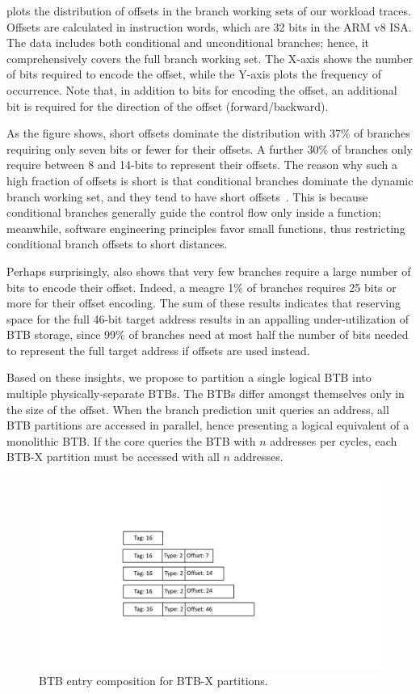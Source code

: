  plots the distribution of offsets in the branch working sets of our workload traces. Offsets are calculated in instruction words, which are 32 bits in the ARM v8 ISA. The data includes both conditional and unconditional branches; hence, it comprehensively covers the full branch working set. The X-axis shows the number of bits required to encode the offset, while the Y-axis plots the frequency of occurrence. Note that, in addition to bits for encoding the offset, an additional bit is required for the direction of the offset (forward/backward). 

As the figure shows, short offsets dominate the distribution with 37\% of branches requiring only seven bits or fewer for their offsets. A further 30\% of branches only require between 8 and 14-bits to represent their offsets. The reason why such a high fraction of offsets is short is that conditional branches dominate the dynamic branch working set, and they tend to have short offsets~\cite{boomerang}. This is because conditional branches generally guide the control flow only inside a function; meanwhile, software engineering principles favor small functions, thus restricting conditional branch offsets to short distances.

Perhaps surprisingly,  also shows that very few branches require a large number of bits to encode their offset. Indeed, a meagre 1\% of branches requires 25 bits or more for their offset encoding. The sum of these results indicates that reserving space for the full 46-bit target address results in an appalling under-utilization of BTB storage, since 99\% of branches need at most half the number of bits needed to represent the full target address if offsets are used instead.  

Based on these insights, we propose to partition a single logical BTB into multiple physically-separate BTBs. The BTBs differ amongst themselves only in the size of the offset. When the branch prediction unit queries an address, all BTB partitions are accessed in parallel, hence presenting a logical equivalent of a monolithic BTB. If the core queries the BTB with $n$ addresses per cycles, each BTB-X partition must be accessed with all $n$ addresses.

\begin{figure}
    \centering
    \includegraphics[width=0.7\columnwidth, trim=230 150 340 150, clip]{figures/x-btb.pdf}
    \caption{BTB entry composition for BTB-X partitions.} 
    \label{cal:fig:btb-dist}
    \vspace{-0.1in}
\end{figure}

